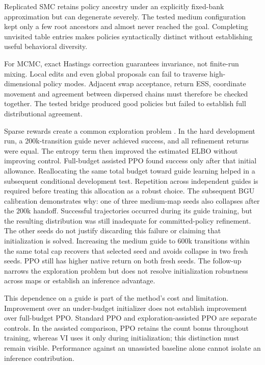 Replicated SMC retains policy ancestry under an explicitly fixed-bank
approximation but can degenerate severely. The tested medium configuration
kept only a few root ancestors and almost never reached the goal. Completing
unvisited table entries makes policies syntactically distinct without
establishing useful behavioral diversity.

For MCMC, exact Hastings correction guarantees invariance, not finite-run
mixing. Local edits and even global proposals can fail to traverse
high-dimensional policy modes. Adjacent swap acceptance, return ESS,
coordinate movement and agreement between dispersed chains must therefore
be checked together. The tested bridge produced good policies but failed
to establish full distributional agreement.


Sparse rewards create a common exploration problem
\citep{andrychowiczEtAl2017}. In the hard development run, a 200k-transition
guide never achieved success, and all refinement returns were equal.
The entropy term then improved the estimated ELBO without improving control.
Full-budget assisted PPO found success only after that initial allowance.
Reallocating the same total budget toward guide learning helped in a
subsequent conditional development test. Repetition across independent
guides is required before treating this allocation as a robust choice. The
subsequent BGU calibration demonstrates why: one of three medium-map seeds
also collapses after the 200k handoff. Successful trajectories occurred during
its guide training, but the resulting distribution was still inadequate for
committed-policy refinement. The other seeds do not justify discarding this
failure or claiming that initialization is solved. Increasing the medium guide
to 600k transitions within the same total cap recovers that selected seed and
avoids collapse in two fresh seeds. PPO still has higher native return on both
fresh seeds. The follow-up narrows the exploration problem but does not resolve
initialization robustness across maps or establish an inference advantage.

This dependence on a guide is part of the method's cost and limitation.
Improvement over an under-budget initializer does not establish improvement
over full-budget PPO. Standard PPO and exploration-assisted PPO are separate
controls. In the assisted comparison, PPO retains the count bonus throughout
training, whereas VI uses it only during initialization; this distinction
must remain visible. Performance against an unassisted baseline alone
cannot isolate an inference contribution.

